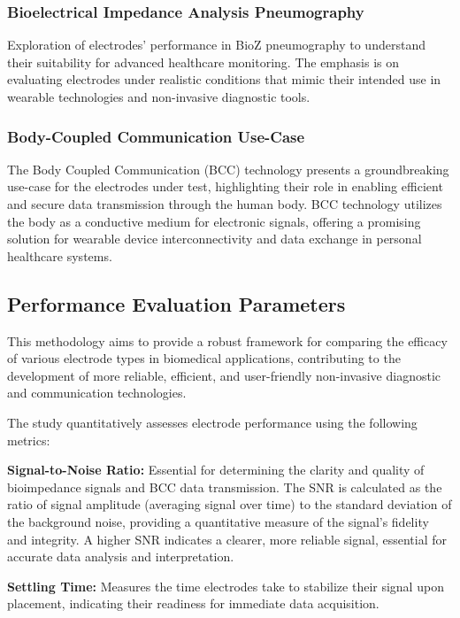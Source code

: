 \documentclass[conference]{IEEEtran}
\begin{document}
\subsubsection{Bioelectrical Impedance Analysis Pneumography}
Exploration of electrodes' performance in \gls{BioZ}   pneumography to understand their suitability for advanced healthcare monitoring. The emphasis is on evaluating electrodes under realistic conditions that mimic their intended use in wearable technologies and non-invasive diagnostic tools.

\subsubsection{Body-Coupled Communication Use-Case}
The Body Coupled Communication (BCC) technology presents a groundbreaking use-case for the electrodes under test, highlighting their role in enabling efficient and secure data transmission through the human body. \gls{BCC} technology utilizes the body as a conductive medium for electronic signals, offering a promising solution for wearable device interconnectivity and data exchange in personal healthcare systems. 



\subsection{Performance Evaluation Parameters}
This methodology aims to provide a robust framework for comparing the efficacy of various electrode types in biomedical applications, contributing to the development of more reliable, efficient, and user-friendly non-invasive diagnostic and communication technologies. 

The study quantitatively assesses electrode performance using the following metrics:

 \textbf{Signal-to-Noise Ratio:} Essential for determining the clarity and quality of bioimpedance signals and \gls{BCC} data transmission.
    The \gls{SNR} is calculated as the ratio of signal amplitude (averaging signal over time) to the standard deviation of the background noise, providing a quantitative measure of the signal's fidelity and integrity. A higher \gls{SNR} indicates a clearer, more reliable signal, essential for accurate data analysis and interpretation.
    
\textbf{Settling Time:} Measures the time electrodes take to stabilize their signal upon placement, indicating their readiness for immediate data acquisition.
    
\end{document}
